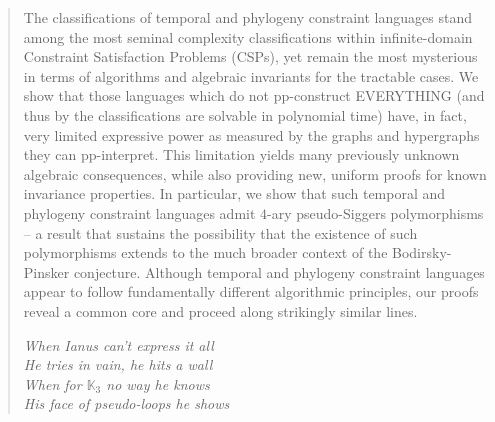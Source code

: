 \documentclass[a4paper,reqno, cleveref]{amsart}
\begin{document}
\begin{abstract}
The  classifications of temporal and phylogeny constraint languages stand among the most seminal complexity classifications within infinite-domain Constraint Satisfaction Problems (CSPs), yet  remain the most mysterious in terms of algorithms and algebraic invariants for the tractable cases. 
 We show that those    languages which do not pp-construct  EVERYTHING (and thus by the classifications are solvable in polynomial time) have, in fact, very  limited expressive power  as measured by the graphs and hypergraphs they can pp-interpret. 
This limitation yields many previously unknown algebraic consequences, while also providing new, uniform proofs for known invariance properties.  In particular, we show that such temporal and phylogeny constraint languages  
admit $4$-ary pseudo-Siggers polymorphisms -- a result that sustains the possibility that the existence of such polymorphisms extends to the much broader context of the Bodirsky-Pinsker conjecture. Although temporal and phylogeny constraint languages appear to follow fundamentally different algorithmic principles, our proofs reveal a common core and proceed along strikingly similar lines.


\vspace{0.1em} 
\begin{flushright}
\begin{minipage}{0.6\textwidth}
\raggedleft 
\textit{When Ianus can't express it all\\ 
He tries in vain, he hits a wall\\ When for $\mathbb{K}_3$ no way he knows\\ His face of pseudo-loops he shows}
\end{minipage}
\end{flushright}

\end{abstract}
\end{document}
